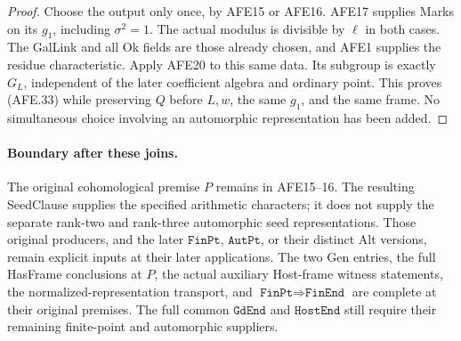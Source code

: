 \begin{proof}
Choose the output only once, by AFE15 or AFE16.
AFE17 supplies Marks on its \(g_1\), including
\(\sigma^2=1\).
The actual modulus is divisible by \(\ell\) in
both cases.  The GalLink and all Ok fields are
those already chosen, and AFE1 supplies the
residue characteristic.
Apply AFE20 to this same data.
Its subgroup is exactly \(G_L\), independent of
the later coefficient algebra and ordinary point.
This proves (AFE.33) while preserving \(Q\) before
\(L,w\), the same \(g_1\), and the same frame.
No simultaneous choice involving an automorphic
representation has been added.
\end{proof}

\paragraph{Boundary after these joins.}
The original cohomological premise \(P\) remains in
AFE15--16.  The resulting SeedClause supplies the
specified arithmetic characters; it does not supply
the separate rank-two and rank-three automorphic
seed representations.  Those original producers,
and the later \(\texttt{FinPt}\), \(\texttt{AutPt}\),
or their distinct Alt versions, remain explicit
inputs at their later applications.  The two Gen
entries, the full HasFrame conclusions at \(P\),
the actual auxiliary Host-frame witness statements,
the normalized-representation transport, and
\(\texttt{FinPt}\Rightarrow\texttt{FinEnd}\)
are complete at their original premises.
The full common \(\texttt{GdEnd}\) and
\(\texttt{HostEnd}\) still require their remaining
finite-point and automorphic suppliers.
